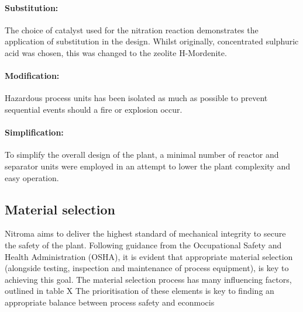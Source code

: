 \paragraph{Substitution:} The choice of catalyst used for the nitration reaction demonstrates the application of substitution in the design. Whilst originally, concentrated sulphuric acid was chosen, this was changed to the zeolite H-Mordenite. 

\paragraph{Modification:} Hazardous process units has been isolated as much as possible to prevent sequential events should a fire or explosion occur. 

\paragraph{Simplification:} To simplify the overall design of the plant, a minimal number of reactor and separator units were employed in an attempt to lower the plant complexity and easy operation.  


\subsection{Material selection}

Nitroma aims to deliver the highest standard of mechanical integrity to secure the safety of the plant.  Following guidance from the Occupational Safety and Health Administration (OSHA), it is evident that appropriate material selection (alongside testing, inspection and maintenance of process equipment), is key to achieving this goal. The material selection process has many influencing factors, outlined in table X
The prioritisation of these elements is key to finding an appropriate balance between process safety and econmocis